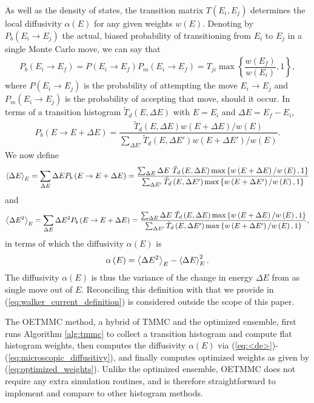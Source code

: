 \documentclass[11pt]{article}
\newcommand{\bk}{\Braket} %
\newcommand{\f}[2]{\dfrac{#1}{#2}} %
\newcommand{\p}[1]{\left(#1\right)} %
\renewcommand{\set}[1]{\left\{#1\right\}} %
\begin{document}
As well as the density of states, the transition matrix $T\p{E_i,E_j}$
determines the local diffusivity $\alpha\p{E}$ for any given weights
$w\p{E}$. Denoting by $P_b\p{E_i\to E_j}$ the actual, biased
probability of transitioning from $E_i$ to $E_j$ in a single Monte
Carlo move, we can say that
\begin{align}
  P_b\p{E_i\to E_f}=P\p{E_i\to E_f}P_m\p{E_i\to E_f}
  =T_{ji}\max\set{\f{w\p{E_f}}{w\p{E_i}},1},
\end{align}
where $P\p{E_i\to E_j}$ is the probability of attempting the move
$E_i\to E_j$ and $P_m\p{E_i\to E_j}$ is the probability of accepting
that move, should it occur. In terms of a transition histogram $\tilde
T_d\p{E,\Delta E}$ with $E=E_i$ and $\Delta E=E_f-E_i$,
\begin{align}
  P_b\p{E\to E+\Delta E} =\f{\tilde T_d\p{E,\Delta E}w\p{E+\Delta
      E}/w\p{E}} {\sum_{\Delta E'}\tilde T_d\p{E,\Delta
      E'}w\p{E+\Delta E'}/w\p{E}}.
  \label{eq:actual_transition_prob}
\end{align}
We now define
\begin{align}
  \bk{\Delta E}_E=\sum_{\Delta E}\Delta E P_b\p{E\to E+\Delta E}
  =\f{\sum_{\Delta E}\Delta E~\tilde T_d\p{E,\Delta E}
    \max\set{w\p{E+\Delta E}/w\p{E},1}} {\sum_{\Delta E'}\tilde
    T_d\p{E,\Delta E'} \max\set{w\p{E+\Delta E'}/w\p{E},1}}
  \label{eq:<de>}
\end{align}
and
\begin{align}
  \bk{\Delta E^2}_E=\sum_{\Delta E}\Delta E^2 P_b\p{E\to E+\Delta E}
  =\f{\sum_{\Delta E}\Delta E~\tilde T_d\p{E,\Delta E}
    \max\set{w\p{E+\Delta E}/w\p{E},1}} {\sum_{\Delta E'}\tilde
    T_d\p{E,\Delta E'} \max\set{w\p{E+\Delta E'}/w\p{E},1}},
  \label{eq:<de^2>}
\end{align}
in terms of which the diffusivity $\alpha\p{E}$ is
\begin{align}
  \alpha\p{E}=\bk{\Delta E^2}_E -\bk{\Delta E}_E^2.
  \label{eq:microscopic_diffusitivy}
\end{align}
The diffusivity $\alpha\p{E}$ is thus the variance of the change in
energy $\Delta E$ from as single move out of $E$. Reconciling this
definition with that we provide in
(\ref{eq:walker_current_definition}) is considered outside the scope
of this paper.

The OETMMC method, a hybrid of TMMC and the optimized ensemble, first
runs Algorithm \ref{alg:tmmc} to collect a transition histogram and
compute flat histogram weights, then computes the diffusivity
$\alpha\p{E}$ via (\ref{eq:<de>})-(\ref{eq:microscopic_diffusitivy}),
and finally computes optimized weights as given by
(\ref{eq:optimized_weights}). Unlike the optimized ensemble, OETMMC
does not require any extra simulation routines, and is therefore
straightforward to implement and compare to other histogram methods.
\end{document}
